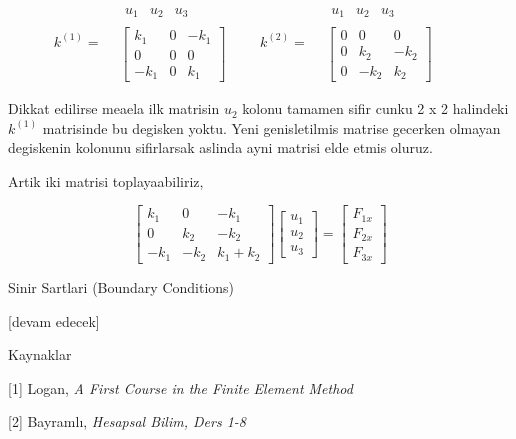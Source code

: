 \documentclass[12pt,fleqn]{article}\usepackage{../../common}
\begin{document}
$$
k^{(1)} =
\begin{array}{cc} & \begin{array}{ccc} u_1 & u_2 & u_3 \end{array} \\ &
\left[
\begin{array}{ccc}
k_1 & 0 & -k_1 \\
0 & 0 & 0 \\
-k_1 & 0 & k_1
\end{array}
\right]
\end{array} \qquad
k^{(2)} =
\begin{array}{cc} & \begin{array}{ccc} u_1 & u_2 & u_3 \end{array} \\ &
\left[
\begin{array}{ccc}
0 & 0 & 0 \\
0 & k_2 & -k_2 \\
0 & -k_2 & k_2
\end{array}
\right]
\end{array} \qquad
$$

Dikkat edilirse meaela ilk matrisin $u_2$ kolonu tamamen sifir cunku 2 x 2
halindeki $k^{(1)}$ matrisinde bu degisken yoktu. Yeni genisletilmis matrise
gecerken olmayan degiskenin kolonunu sifirlarsak aslinda ayni matrisi elde etmis
oluruz.

Artik iki matrisi toplayaabiliriz,

$$
\left[\begin{array}{ccc}
k_1 & 0 & -k_1 \\
0 & k_2 & -k_2 \\
-k_1 & -k_2 & k_1+k_2
\end{array}\right]
\left[\begin{array}{c}
u_1 \\ u_2 \\ u_3
\end{array}\right] =
\left[\begin{array}{c}
F_{1x} \\ F_{2x} \\ F_{3x}
\end{array}\right]
$$

Sinir Sartlari (Boundary Conditions)










[devam edecek]



Kaynaklar

[1] Logan, {\em A First Course in the Finite Element Method}

[2] Bayramlı, {\em Hesapsal Bilim, Ders 1-8}
\end{document}
